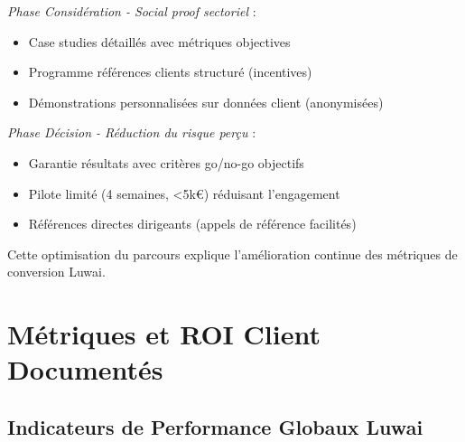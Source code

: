 \emph{Phase Considération - Social proof sectoriel} :
\begin{itemize}
    \item Case studies détaillés avec métriques objectives
    \item Programme références clients structuré (incentives)
    \item Démonstrations personnalisées sur données client (anonymisées)
\end{itemize}
\medskip
\emph{Phase Décision - Réduction du risque perçu} :
\begin{itemize}
    \item Garantie résultats avec critères go/no-go objectifs
    \item Pilote limité (4 semaines, <5k€) réduisant l'engagement
    \item Références directes dirigeants (appels de référence facilités)
\end{itemize}
\medskip
Cette optimisation du parcours explique l'amélioration continue des métriques de conversion Luwai.

\section{Métriques et ROI Client Documentés}

\subsection{Indicateurs de Performance Globaux Luwai}

